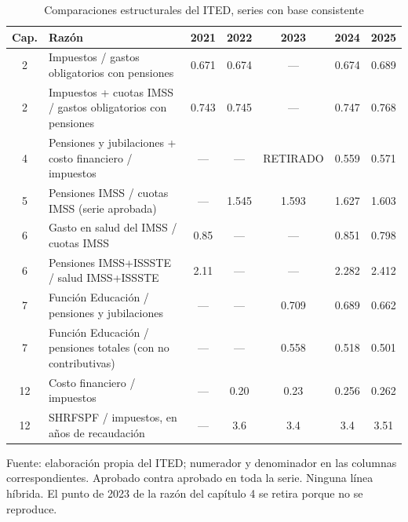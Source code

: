 \begin{table}[htbp]
\centering
\caption{Comparaciones estructurales del ITED, series con base consistente}
\label{tab:CR_1}
\footnotesize
\setlength{\tabcolsep}{4pt}
\begin{tabular}{cL{5.2cm}ccccc}
\toprule
{Cap.} & {Razón} & {2021} & {2022} & {2023} & {2024} & {2025} \\
\midrule
\num{2} & {Impuestos / gastos obligatorios con pensiones} & \num{0.671} & \num{0.674} & {---} & \num{0.674} & \num{0.689} \\
\num{2} & {Impuestos + cuotas IMSS / gastos obligatorios con pensiones} & \num{0.743} & \num{0.745} & {---} & \num{0.747} & \num{0.768} \\
\num{4} & {Pensiones y jubilaciones + costo financiero / impuestos} & {---} & {---} & {RETIRADO} & \num{0.559} & \num{0.571} \\
\num{5} & {Pensiones IMSS / cuotas IMSS (serie aprobada)} & {---} & \num{1.545} & \num{1.593} & \num{1.627} & \num{1.603} \\
\num{6} & {Gasto en salud del IMSS / cuotas IMSS} & \num{0.85} & {---} & {---} & \num{0.851} & \num{0.798} \\
\num{6} & {Pensiones IMSS+ISSSTE / salud IMSS+ISSSTE} & \num{2.11} & {---} & {---} & \num{2.282} & \num{2.412} \\
\num{7} & {Función Educación / pensiones y jubilaciones} & {---} & {---} & \num{0.709} & \num{0.689} & \num{0.662} \\
\num{7} & {Función Educación / pensiones totales (con no contributivas)} & {---} & {---} & \num{0.558} & \num{0.518} & \num{0.501} \\
\num{12} & {Costo financiero / impuestos} & {---} & \num{0.20} & \num{0.23} & \num{0.256} & \num{0.262} \\
\num{12} & {SHRFSPF / impuestos, en años de recaudación} & {---} & \num{3.6} & \num{3.4} & \num{3.4} & \num{3.51} \\
\bottomrule
\end{tabular}
\par\vspace{2pt}\footnotesize Fuente: elaboración propia del ITED; numerador y denominador en las columnas correspondientes. Aprobado contra aprobado en toda la serie. Ninguna línea híbrida. El punto de 2023 de la razón del capítulo 4 se retira porque no se reproduce.
\end{table}
